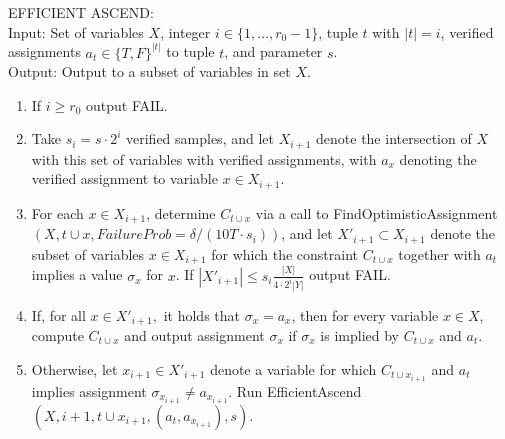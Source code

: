 \documentclass[anon,12pt]{colt2018}
\begin{document}
\begin{algorithm}[H]
EFFICIENT ASCEND:\\
Input: Set of variables $X$, integer $i \in \{1,\ldots,r_0-1\}$, tuple $t$ with $|t|=i$, verified assignments $a_t \in \{T,F\}^{|t|}$ to tuple $t$, and parameter $s$.  \\
Output: Output to a subset of variables in set $X$.
\begin{enumerate}
\item If $i \ge r_0$ output FAIL.
\item Take $s_i = s\cdot 2^i$ verified samples, and let $X_{i+1}$ denote the intersection of $X$ with this set of variables with verified assignments, with $a_x$ denoting the verified assignment to variable $x \in X_{i+1}.$  
\item For each $x \in X_{i+1}$, determine $C_{t \cup x}$ via a call to FindOptimisticAssignment$(X,t \cup x, FailureProb=\delta/(10T\cdot s_i))$, and  let $X'_{i+1} \subset X_{i+1}$ denote the subset of variables $x \in X_{i+1}$ for which the  constraint $C_{t \cup x}$ together with $a_t$ implies a value $\sigma_x$ for $x$.   If $|X'_{i+1}| \le s_i \frac{|X|}{4 \cdot 2^{i} |Y|}$ output FAIL.
\item If, for all $x \in X'_{i+1},$ it holds that $\sigma_x = a_x$, then for every variable $x \in X$, compute $C_{t \cup x}$ and output assignment $\sigma_x$ if $\sigma_x$ is implied by $C_{t \cup x}$ and $a_t.$  
\item Otherwise, let $x_{i+1} \in X'_{i+1}$ denote a variable for which $C_{t \cup x_{i+1}}$ and $a_t$ implies assignment $\sigma_{x_{i+1}} \neq a_{x_{i+1}}$.  Run EfficientAscend$(X, i+1, t\cup x_{i+1}, (a_t,a_{x_{i+1}}),s).$
\end{enumerate}
\end{algorithm}
\end{document}
